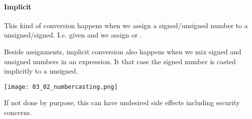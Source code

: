 \paragraph{Implicit}
This kind of conversion happens when we assign a signed/unsigned number to a unsigned/signed. I.e. given  and we assign  or .

Beside assignments, implicit conversion also happens when we mix signed and unsigned numbers in an expression. It that case the signed number is casted implicitly to a unsigned. 

\texttt{[image: 03\_02\_numbercasting.png]}

If not done by purpose, this can have undesired side effects including security concerns.
